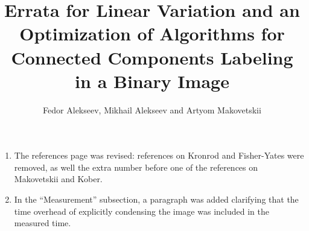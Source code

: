 \documentclass{article}
\begin{document}
\title{Errata for Linear Variation and an Optimization of Algorithms for Connected
Components Labeling in a Binary Image}

\author{Fedor Alekseev, Mikhail Alekseev and Artyom Makovetskii}

\date{}

\maketitle

\begin{enumerate}
  \item The references page was revised: references on Kronrod and Fisher-Yates
    were removed, as well the extra number before one of the references on
    Makovetskii and Kober.
  \item In the ``Measurement'' subsection, a paragraph was added clarifying that
    the time overhead of explicitly condensing the image was included in the
    measured time.
\end{enumerate}
\end{document}
